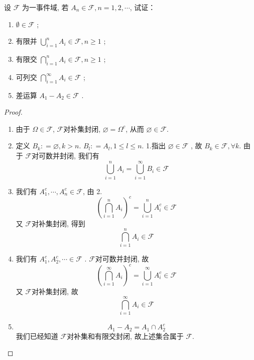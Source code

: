 \documentclass[../main.tex]{subfiles}
\begin{document}
\begin{exercise}{}{}
    设 $\mathscr{F}$ 为一事件域, 若 $A_n \in \mathscr{F}, n=1,2,\cdots$, 试证：
\begin{enumerate}
\item $\emptyset \in \mathscr{F}$ ;
\item 有限并 $\bigcup_{i=1}^{n} A_i \in \mathscr{F}, n \ge 1$ ;
\item 有限交 $\bigcap_{i=1}^{n} A_i \in \mathscr{F}, n \ge 1$ ;
\item 可列交 $\bigcap_{i=1}^{\infty} A_i \in \mathscr{F}$ ;
\item 差运算 $A_1 - A_2 \in \mathscr{F}$ .
\end{enumerate}
\end{exercise}
\begin{proof}
    \begin{enumerate}
        \item 由于 \(   \Omega  \in \mathcal{F}  \), \(  \mathcal{F}  \)对补集封闭, \(  \varnothing =   \Omega ^{c}  \), 从而 \(  \varnothing\in \mathcal{F}  \).
        \item 定义 \(  B_{k}: = \varnothing, k> n  \). \(  B_{l}: = A_{l}, 1\le l \le n  \). 1.指出 \(  \varnothing\in \mathcal{F}  \)  , 故 \(  B_{k} \in \mathcal{F},\forall k  \).  由于 \(  \mathcal{F}  \)对可数并封闭, 我们有 \[
        \bigcup _{i= 1}^{n}A_{i}= \bigcup _{i= 1}^{\infty}B_{i}\in \mathcal{F} 
        \]    
        \item  我们有 \(  A_{1}^{c},\cdots ,A_{n}^{c}\in \mathcal{F}  \), 由 2. \[
       \left(  \bigcap_{i= 1}^{n}A_{i} \right)^{c} =\bigcup _{i= 1}^{n}A_{i}^{c} \in \mathcal{F}
        \] 又 \(  \mathcal{F}  \)对补集封闭, 得到 \[
        \bigcap_{i= 1}^{n}A_{i}\in \mathcal{F} 
        \]
        \item 我们有 \(  A_1^{c},A_2^{c},\cdots \in \mathcal{F}  \) . \(  \mathcal{F}  \)对可数并封闭, 故 \[
        \left( \bigcap  _{i= 1}^{\infty}A_{i} \right)^{c}= \bigcup _{i= 1}^{\infty}A_{i}^{c}  \in \mathcal{F}
        \]又 \(  \mathcal{F}  \)对补集封闭, 故 \[
        \bigcap _{i= 1}^{\infty}A_{i}\in \mathcal{F}
        \]  
        \item  \[
        A_1-A_2= A_1\cap A_2^{c}
        \]我们已经知道 \(  \mathcal{F}  \)对补集和有限交封闭, 故上述集合属于 \(  \mathcal{F}  \).  
    \end{enumerate}
    
\end{proof}
\end{document}
